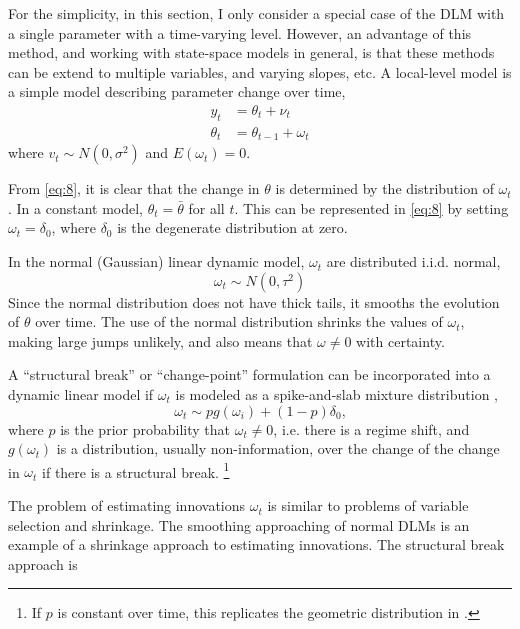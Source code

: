 \documentclass{article}
\begin{document}
For the simplicity, in this section, I only consider a special case of the DLM with a single parameter with a time-varying level. 
However, an advantage of this method, and working with state-space models in general, is that these methods can be extend to multiple variables, and varying slopes, etc.
A local-level model is a simple model describing parameter change over time,
\begin{equation}
  \label{eq:8}
  \begin{aligned}
    y_t &= \theta_t + \nu_t \\
    \theta_t &= \theta_{t-1} + \omega_t
  \end{aligned}
\end{equation}
where $v_{t} \sim N(0, \sigma^{2})$ and $E(\omega_t) = 0$.

From \eqref{eq:8}, it is clear that the change in $\theta$ is determined by the distribution of $\omega_{t}$.
In a constant model, $\theta_{t} = \bar{\theta}$ for all $t$. 
This can be represented in \eqref{eq:8} by setting $\omega_{t} = \delta_{0}$, where $\delta_{0}$ is the degenerate distribution at zero.

In the normal (Gaussian) linear dynamic model, $\omega_{t}$ are distributed i.i.d. normal,
\begin{equation}
  \label{eq:2}
  \omega_{t} \sim N(0, \tau^{2})
\end{equation}
Since the normal distribution does not have thick tails, it smooths the evolution of $\theta$ over time.
The use of the normal distribution shrinks the values of $\omega_{t}$, making large jumps unlikely, 
and also means that $\omega \neq 0$ with certainty.

A ``structural break'' or ``change-point'' formulation can be incorporated into a dynamic linear model if $\omega_{t}$ is modeled as a spike-and-slab mixture distribution \parencite{GiordaniKohn2008},
\begin{equation}
  \label{eq:1}
  \omega_{t} \sim p g(\omega_{i}) + (1 - p) \delta_{0} \text{,}
\end{equation}
where $p$ is the prior probability that $\omega_{t} \neq 0$, i.e. there is a regime shift, and 
$g(\omega_{t})$ is a distribution, usually non-information, over the change of the change in $\omega_{t}$ if there is a structural break.
\footnote{If $p$ is constant over time, this replicates the geometric distribution in \textcite{Chib1998}.}

The problem of estimating innovations $\omega_{t}$ is similar to problems of variable selection and shrinkage.
The smoothing approaching of normal DLMs is an example of a shrinkage approach to estimating innovations.
The structural break approach is 
\end{document}
